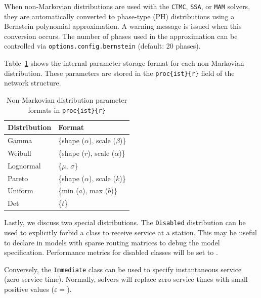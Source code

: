 When non-Markovian distributions are used with the \texttt{CTMC}, \texttt{SSA}, or \texttt{MAM} solvers, they are automatically converted to phase-type (PH) distributions using a Bernstein polynomial approximation. A warning message is issued when this conversion occurs. The number of phases used in the approximation can be controlled via \texttt{options.config.bernstein} (default: 20 phases).

Table~\ref{tab:nonmarkov-params} shows the internal parameter storage format for each non-Markovian distribution. These parameters are stored in the \texttt{proc\{ist\}\{r\}} field of the network structure.

\begin{table}[t!]
\centering
\caption{Non-Markovian distribution parameter formats in \texttt{proc\{ist\}\{r\}}}
\label{tab:nonmarkov-params}
\begin{tabular}{|l|l|}
\hline
\textbf{Distribution} & \textbf{Format} \\
\hline
Gamma & \{shape ($\alpha$), scale ($\beta$)\} \\
\hline
Weibull & \{shape ($r$), scale ($\alpha$)\} \\
\hline
Lognormal & \{$\mu$, $\sigma$\} \\
\hline
Pareto & \{shape ($\alpha$), scale ($k$)\} \\
\hline
Uniform & \{min ($a$), max ($b$)\} \\
\hline
Det & \{$t$\} \\
\hline
\end{tabular}
\end{table}

Lastly, we discuss two special distributions. The \texttt{Disabled} distribution can be used to explicitly forbid a class to receive service at a station. This may be useful to declare in models with sparse routing matrices to debug the model specification. Performance metrics for disabled classes will be set to .

Conversely, the \texttt{Immediate} class can be used to specify instantaneous service (zero service time). Normally, solvers will replace zero service times with small positive values ($\varepsilon=$).


